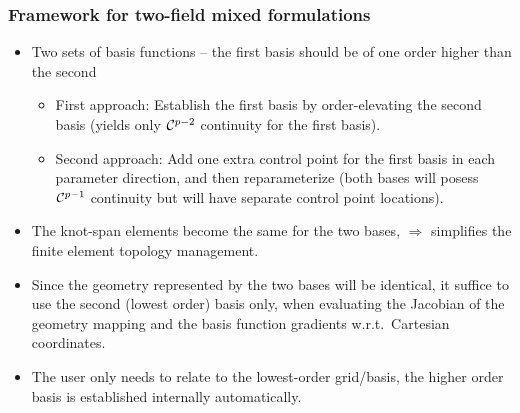 \documentclass{beamer}
\begin{document}
\frame %
{
 \frametitle{Framework for two-field mixed formulations}

 \begin{itemize}
  \item<1-> Two sets of basis functions --
            the first basis should be of one order higher than the second
  \begin{itemize}
   \item<2-> First approach: Establish the first basis by order-elevating
             the second basis (yields only ${\cal C}^{p-2}$ continuity
             for the first basis).
   \item<2-> Second approach: Add one extra control point for the first basis
             in each parameter direction, and then reparameterize (both bases
             will posess ${\cal C}^{p-1}$ continuity but will have separate
             control point locations).
  \end{itemize}
  \item<3-> The knot-span elements become the same for the two bases,
            $\Rightarrow$ simplifies the finite element topology management.
  \item<4-> Since the geometry represented by the two bases will be identical,
            it suffice to use the second (lowest order) basis only,
            when evaluating the Jacobian of the geometry mapping
            and the basis function gradients w.r.t.\ Cartesian coordinates.
  \item<5-> The user only needs to relate to the lowest-order grid/basis, the
            higher order basis is established internally automatically.
 \end{itemize}
}
\end{document}
